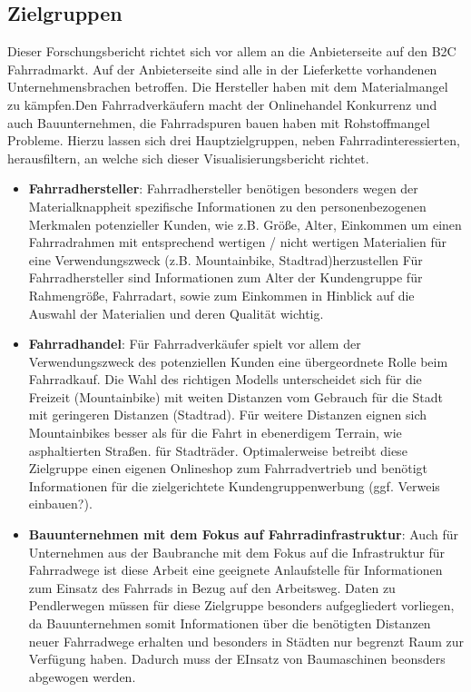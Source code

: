 \documentclass[usegeometry=true]{scrartcl}
\begin{document}
\subsection{Zielgruppen}
Dieser Forschungsbericht richtet sich vor allem an die Anbieterseite auf den B2C Fahrradmarkt. Auf der Anbieterseite sind alle in der Lieferkette vorhandenen Unternehmensbrachen betroffen. Die Hersteller haben mit dem Materialmangel zu kämpfen.Den Fahrradverkäufern macht der Onlinehandel Konkurrenz und auch Bauunternehmen, die Fahrradspuren bauen haben mit Rohstoffmangel Probleme.  Hierzu lassen sich drei Hauptzielgruppen, neben Fahrradinteressierten, herausfiltern, an welche sich dieser Visualisierungsbericht richtet.
\begin{itemize}
 \item \textbf{Fahrradhersteller}: 
 \newline Fahrradhersteller benötigen besonders wegen der Materialknappheit spezifische Informationen zu den personenbezogenen Merkmalen potenzieller Kunden, wie z.B. Größe, Alter, Einkommen um einen Fahrradrahmen mit entsprechend wertigen / nicht wertigen Materialien für eine Verwendungszweck (z.B. Mountainbike, Stadtrad)herzustellen 
 Für Fahrradhersteller sind Informationen zum Alter der Kundengruppe für Rahmengröße, Fahrradart, sowie zum Einkommen in Hinblick auf die Auswahl der Materialien und deren Qualität wichtig. 
 \item \textbf{Fahrradhandel}:
 \newline Für Fahrradverkäufer spielt vor allem der Verwendungszweck des potenziellen Kunden eine übergeordnete Rolle beim Fahrradkauf. Die Wahl des richtigen Modells unterscheidet sich für die Freizeit (Mountainbike) mit weiten Distanzen vom Gebrauch für die Stadt mit geringeren Distanzen (Stadtrad). Für weitere Distanzen eignen sich Mountainbikes besser als für die Fahrt in ebenerdigem Terrain, wie asphaltierten Straßen. für Stadträder. Optimalerweise betreibt diese Zielgruppe einen eigenen Onlineshop zum Fahrradvertrieb und benötigt Informationen für die zielgerichtete Kundengruppenwerbung (ggf. Verweis einbauen?). 

 \item \textbf{Bauunternehmen mit dem Fokus auf Fahrradinfrastruktur}:
 \newline Auch für Unternehmen aus der Baubranche mit dem Fokus auf die Infrastruktur für Fahrradwege ist diese Arbeit eine geeignete Anlaufstelle für Informationen zum Einsatz des Fahrrads in Bezug auf den Arbeitsweg. Daten zu Pendlerwegen müssen für diese Zielgruppe besonders aufgegliedert vorliegen, da Bauunternehmen somit Informationen über die benötigten Distanzen neuer Fahrradwege erhalten und besonders in Städten nur begrenzt Raum zur Verfügung haben. Dadurch muss der EInsatz von Baumaschinen beonsders abgewogen werden. 
 
\end{itemize}
\end{document}
